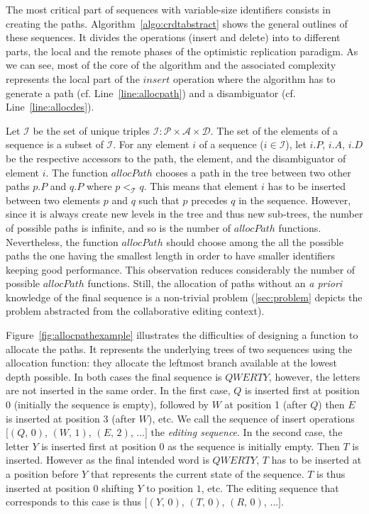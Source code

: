 The most critical part of sequences with variable-size identifiers consists in
creating the paths. Algorithm~\ref{algo:crdtabstract} shows the general
outlines of these sequences. It divides the operations (insert and delete) into
to different parts, the local and the remote phases of the optimistic
replication paradigm. As we can see, most of the core of the algorithm and the
associated complexity represents the local part of the $insert$ operation where
the algorithm has to generate a path (cf. Line~\ref{line:allocpath}) and a
disambiguator (cf. Line~\ref{line:allocdes}).

Let $\mathcal{I}$ be the set of unique triples
$\mathcal{I}: \mathcal{P}\times\mathcal{A}\times\mathcal{D}$. The set of the
elements of a sequence is a subset of $\mathcal{I}$. For any element $i$ of a
sequence ($i \in \mathcal{I}$), let $i.P$, $i.A$, $i.D$ be the respective
accessors to the path, the element, and the disambiguator of element $i$. The
function $allocPath$ chooses a path in the tree between two other paths $p.P$
and $q.P$ where $p<_{\mathcal{T}}q$. This means that element $i$ has to be
inserted between two elements $p$ and $q$ such that $p$ precedes $q$ in the
sequence. However, since it is always create new levels in the tree and thus
new sub-trees, the number of possible paths is infinite, and so is the number
of $allocPath$ functions. Nevertheless, the function $allocPath$ should choose
among the all the possible paths the one having the smallest length in order to
have smaller identifiers keeping good performance. This observation reduces
considerably the number of possible $allocPath$ functions. Still, the
allocation of paths without an \emph{a priori} knowledge of the final sequence
is a non-trivial problem (\ref{sec:problem} depicts the problem abstracted from
the collaborative editing context).

Figure~\ref{fig:allocpathexample} illustrates the difficulties of designing a
function to allocate the paths. It represents the underlying trees of two
sequences using the allocation function: they allocate the leftmost branch
available at the lowest depth possible. In both cases the final sequence is
$QWERTY$, however, the letters are not inserted in the same order. In the first
case, $Q$ is inserted first at position 0 (initially the sequence is empty),
followed by $W$ at position 1 (after $Q$) then $E$ is inserted at position 3
(after $W$), etc. We call the sequence of insert operations $[(Q,\,0)$,
$(W,\,1)$, $(E,\,2)$, $\ldots]$ the \emph{editing sequence}. In the second
case, the letter $Y$ is inserted first at position 0 as the sequence is
initially empty. Then $T$ is inserted. However as the final intended word is
$QWERTY$, $T$ has to be inserted at a position before $Y$ that represents the
current state of the sequence. $T$ is thus inserted at position 0 shifting $Y$
to position $1$, etc. The editing sequence that corresponds to this case
is thus $[(Y,\,0)$, $(T,\,0)$, $(R,\,0)$, $\ldots]$.

